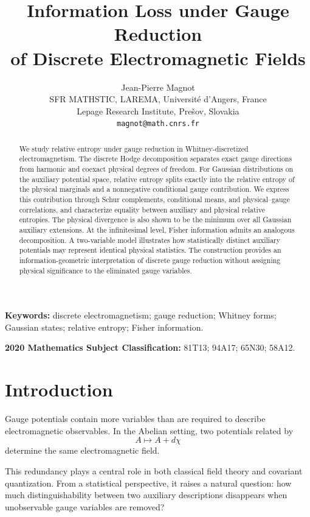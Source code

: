 \documentclass[11pt]{article}
\title{
Information Loss under Gauge Reduction\\
of Discrete Electromagnetic Fields
}
\author{
Jean-Pierre Magnot\\
SFR MATHSTIC, LAREMA, Université d'Angers, France\\
Lepage Research Institute, Prešov, Slovakia\\
\texttt{magnot@math.cnrs.fr}
}
\date{}
\theoremstyle{remark}
\begin{document}
\maketitle

\begin{abstract}
We study relative entropy under gauge reduction in
Whitney-discretized electromagnetism. The discrete Hodge
decomposition separates exact gauge directions from harmonic and
coexact physical degrees of freedom. For Gaussian distributions on
the auxiliary potential space, relative entropy splits exactly into
the relative entropy of the physical marginals and a nonnegative
conditional gauge contribution. We express this contribution through
Schur complements, conditional means, and physical--gauge
correlations, and characterize equality between auxiliary and
physical relative entropies. The physical divergence is also shown
to be the minimum over all Gaussian auxiliary extensions. At the
infinitesimal level, Fisher information admits an analogous
decomposition. A two-variable model illustrates how statistically
distinct auxiliary potentials may represent identical physical
statistics. The construction provides an information-geometric
interpretation of discrete gauge reduction without assigning
physical significance to the eliminated gauge variables.
\end{abstract}

\medskip

\noindent
\textbf{Keywords:}
discrete electromagnetism; gauge reduction; Whitney forms;
Gaussian states; relative entropy; Fisher information.

\medskip

\noindent
\textbf{2020 Mathematics Subject Classification:}
81T13; 94A17; 65N30; 58A12.

\section{Introduction}

Gauge potentials contain more variables than are required to
describe electromagnetic observables. In the Abelian setting, two
potentials related by
\begin{equation}
A\longmapsto A+d\chi
\label{eq:continuous-gauge}
\end{equation}
determine the same electromagnetic field.

This redundancy plays a central role in both classical field theory
and covariant quantization. From a statistical perspective, it
raises a natural question: how much distinguishability between two
auxiliary descriptions disappears when unobservable gauge variables
are removed?
\end{document}

